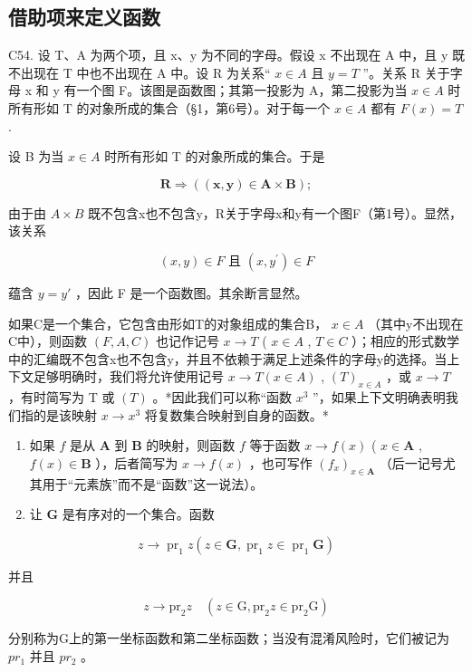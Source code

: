\subsection{借助项来定义函数}

C54. 设 T、A 为两个项，且 x、y 为不同的字母。假设 x 不出现在 A 中，且 y 既不出现在 T 中也不出现在 A 中。设 R 为关系“ \(x \in A\) 且 \(y = T\) ”。关系 R 关于字母 x 和 y 有一个图 F。该图是函数图；其第一投影为 A，第二投影为当 \(x \in A\) 时所有形如 T 的对象所成的集合（§1，第6号）。对于每一个 \(x \in A\) 都有 \(F(x) = T\) .

设 B 为当 \(x \in A\) 时所有形如 T 的对象所成的集合。于是

\[
\boldsymbol {R} \Longrightarrow ((\boldsymbol {x}, \boldsymbol {y}) \in \boldsymbol {A} \times \boldsymbol {B});
\]

由于由 \(A \times B\) 既不包含x也不包含y，R关于字母x和y有一个图F（第1号）。显然，该关系

\[
(x, y) \in F \text {   且   } (x, y ^ {\prime}) \in F
\]

蕴含 \(y = y'\) ，因此 F 是一个函数图。其余断言显然。

如果C是一个集合，它包含由形如T的对象组成的集合B， \(x \in A\) （其中y不出现在C中），则函数 \((F, A, C)\) 也记作记号 \(x \to T\) ( \(x \in A\) , \(T \in C\) ）；相应的形式数学中的汇编既不包含x也不包含y，并且不依赖于满足上述条件的字母y的选择。当上下文足够明确时，我们将允许使用记号 \(x \to T(x \in A)\) , \((T)_{x \in A}\) ，或 \(x \to T\) ，有时简写为 T 或 \((T)\) 。*因此我们可以称“函数 \(x^{3}\) ''，如果上下文明确表明我们指的是该映射 \(x \to x^{3}\) 将复数集合映射到自身的函数。*


\begin{enumerate}
\def\labelenumi{(\arabic{enumi})}
\item
  如果 \(f\) 是从 \(\mathbf{A}\) 到 \(\mathbf{B}\) 的映射，则函数 \(f\) 等于函数 \(x \to f(x)\) ( \(x \in \mathbf{A}\) , \(f(x) \in \mathbf{B}\) ），后者简写为 \(x \to f(x)\) ，也可写作 \((f_x)_{x \in \mathbf{A}}\) （后一记号尤其用于“元素族”而不是“函数”这一说法）。
\item
  让 \(\mathbf{G}\) 是有序对的一个集合。函数
\end{enumerate}

\[
z \rightarrow \operatorname{pr} _ {1} z (z \in \mathbf {G}, \operatorname{pr} _ {1} z \in \operatorname{pr} _ {1} \mathbf {G})
\]

并且

\[
z \rightarrow \mathrm{pr} _ {2} z \quad (z \in \mathrm{G}, \mathrm{pr} _ {2} z \in \mathrm{pr} _ {2} \mathrm{G})
\]

分别称为G上的第一坐标函数和第二坐标函数；当没有混淆风险时，它们被记为 \(pr_{1}\) 并且 \(pr_{2}\) 。

